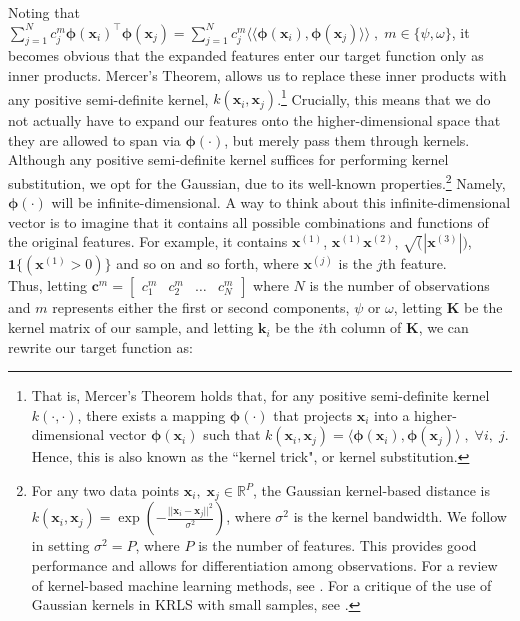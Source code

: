 \documentclass[12pt]{article}
\newcommand{\x}{\mathbf{x}}
\newcommand{\K}{\mathbf{K}}
\renewcommand{\k}{\mathbf{k}}
\newcommand{\bc}{\mathbf{c}}
\renewcommand{\r}{\right}
\renewcommand{\l}{\left}
\newcommand{\bphi}{\bm{\phi}}
\begin{document}
Noting that $\sum^N_{j=1} c^m_j \bphi(\x_i)^\top \bphi(\x_j) = \sum^N_{j=1} c^m_j \langle\langle \bphi(\x_i), \bphi(\x_j) \rangle\rangle \; , \; m \in \{\psi,\omega\}$, it becomes obvious that the expanded features enter our target function only as inner products. Mercer's Theorem, allows us to replace these inner products with any positive semi-definite kernel, $k(\x_i,\x_j)$.\footnote{That is, Mercer's Theorem holds that, for any positive semi-definite kernel $k(\cdot,\cdot)$, there exists a mapping $\bphi(\cdot)$ that projects $\x_i$ into a higher-dimensional vector $\bphi(\x_i)$ such that $ k(\x_i,\x_j)=\langle \bphi(\x_i), \bphi(\x_j) \rangle \; , \; \forall i, \; j$. Hence, this is also known as the ``kernel trick", or kernel substitution.} Crucially, this means that we do not actually have to expand our features onto the higher-dimensional space that they are allowed to span via $\bphi(\cdot)$, but merely pass them through kernels. Although any positive semi-definite kernel suffices for performing kernel substitution, we opt for the Gaussian, due to its well-known properties.\footnote{For any two data points $\x_i, \; \x_j \in \mathbb{R}^P$, the Gaussian kernel-based distance is $k(\x_i,\x_j) = \exp \l( -\frac{||\x_i-\x_j||^2}{\sigma^2} \r)$, where $\sigma^2$ is the kernel bandwidth. We follow \cite{Hainmueller2013} in setting $\sigma^2 = P$, where $P$ is the number of features. This provides good performance and allows for differentiation among observations. For a review of kernel-based machine learning methods, see \cite{Scholkopf2002}. For a critique of the use of Gaussian kernels in KRLS with small samples, see \cite{Braga2015}.} Namely, $\bphi(\cdot)$ will be infinite-dimensional. A way to think about this infinite-dimensional vector is to imagine that it contains all possible combinations and functions of the original features. For example, it contains $\x^{(1)}$, $\x^{(1)} \x^{(2)}$, $\sqrt(|\x^{(3)}|)$, $\mathbf{1}\{(\x^{(1)} > 0)\}$ and so on and so forth, where $\x^{(j)}$ is the $j$th feature.	\\

Thus, letting $\bc^m = \begin{bmatrix} c^m_1 & c^m_2 & \dots & c^m_N\end{bmatrix}$ where $N$ is the number of observations and $m$ represents either the first or second components, $\psi$ or $\omega$, letting $\K$ be the kernel matrix of our sample, and letting $\k_i$ be the $i$th column of $\K$, we can rewrite our target function as:
\end{document}
